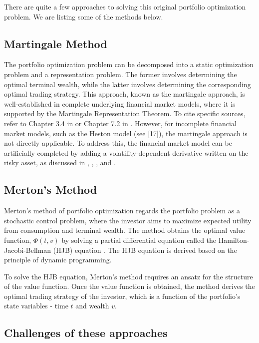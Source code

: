 There are quite a few approaches to solving this original portfolio optimization problem. We are listing some of the methods below.
\subsection{Martingale Method}
The portfolio optimization problem can be decomposed into a static optimization problem and a representation problem. The former involves determining the optimal terminal wealth, while the latter involves determining the corresponding optimal trading strategy. This approach, known as the martingale approach, is well-established in complete underlying financial market models, where it is supported by the Martingale Representation Theorem. To cite specific sources, refer to Chapter 3.4 in \cite{Korn1997} or Chapter 7.2 in \cite{Zagst2019}. However, for incomplete financial market models, such as the Heston model (see [17]), the martingale approach is not directly applicable. To address this, the financial market model can be artificially completed by adding a volatility-dependent derivative written on the risky asset, as discussed in \cite{Branger2008}, \cite{Branger2017}, \cite{Escobar2018}, and \cite{Liu2003}. 

\subsection{Merton's Method}

Merton's method of portfolio optimization \cite{Merton1969} regards the portfolio problem as a stochastic control problem, where the investor aims to maximize expected utility from consumption and terminal wealth. The method obtains the optimal value function, $\Phi (t,v)$ by solving a partial differential equation called the Hamilton-Jacobi-Bellman (HJB) equation \cite{korn2001optimal} \cite{davis1990portfolio}. The HJB equation is derived based on the principle of dynamic programming.

To solve the HJB equation, Merton's method requires an ansatz for the structure of the value function. Once the value function is obtained, the method derives the optimal trading strategy of the investor, which is a function of the portfolio's state variables - time $t$ and wealth $v$. 

\subsection{Challenges of these approaches}


